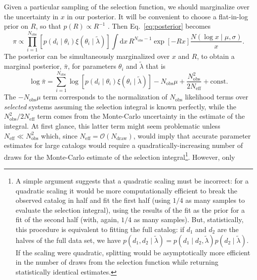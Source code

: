 \documentclass[modern]{aastex62}
\newcommand{\dd}{\mathrm{d}}
\newcommand{\Ndraw}{N_\mathrm{draw}}
\newcommand{\Neff}{N_\mathrm{eff}}
\newcommand{\Nobs}{N_\mathrm{obs}}
\begin{document}
Given a particular sampling of the selection function, we should marginalize
over the uncertainty in $x$ in our posterior.  It will be convenient to choose a
flat-in-log prior on $R$, so that $p(R) \propto R^{-1}$
\citep{Fishbach2018,Mandel2018}.  Then Eq.\ \eqref{eq:posterior} becomes
%
\begin{equation}
  \label{eq:posterior-integrated}
    \pi \propto \prod_{i = 1}^{\Nobs} \left[ p\left( d_i \mid \theta_i \right) \xi\left( \theta_i \mid \tilde{\lambda} \right) \right] \int \dd x \, R^{\Nobs - 1} \exp\left[ -R x \right] \frac{N\left( \log x \mid \mu, \sigma\right)}{x}.
\end{equation}
%
The posterior can be simultaneously marginalized over $x$ and $R$, to obtain a
marginal posterior, $\bar{\pi}$, for parameters $\theta_i$ and $\tilde{\lambda}$
that is
%
\begin{equation}
  \log \bar{\pi} = \sum_{i = 1}^{\Nobs} \log \left[ p\left( d_i \mid \theta_i \right) \xi\left( \theta_i \mid \tilde{\lambda} \right) \right] - \Nobs \mu + \frac{\Nobs^2}{2 \Neff} + \mathrm{const}.
\end{equation}
%
The $-\Nobs\mu$ term corresponds to the normalization of $\Nobs$ likelihood
terms over \emph{selected} systems \citep{Mandel2018} assuming the selection
integral is known perfectly, while the $\Nobs^2/2\Neff$ term comes from the
Monte-Carlo uncertainty in the estimate of the integral.  At first glance, this
latter term might seem problematic unless $\Neff \ll \Nobs^2$ which, since
$\Neff = \mathcal{O}\left( \Ndraw \right)$, would imply that accurate parameter
estimates for large catalogs would require a quadratically-increasing number of
draws for the Monte-Carlo estimate of the selection integral\footnote{A simple
argument suggests that a quadratic scaling must be incorrect: for a quadratic
scaling it would be more computationally efficient to break the observed catalog
in half and fit the first half (using $1/4$ as many samples to evaluate the
selection integral), using the results of the fit as the prior for a fit of the
second half (with, again, $1/4$ as many samples).  But, statistically, this
procedure is equivalent to fitting the full catalog: if $d_1$ and $d_2$ are the
halves of the full data set, we have $p\left( d_1, d_2 \mid
\tilde{\lambda}\right) = p\left( d_1 \mid d_2, \tilde{\lambda}\right) p\left(
d_2 \mid \tilde{\lambda} \right)$.  If the scaling were quadratic, splitting
would be asymptotically more efficient in the number of draws from the selection
function while returning statistically identical estimates.}.  However, only
\end{document}
